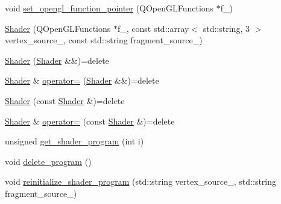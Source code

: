 \begin{DoxyCompactItemize}
\item 
void \mbox{\hyperlink{classShader_a28b5fcd256a5182778c860c961ae6a31}{set\+\_\+opengl\+\_\+function\+\_\+pointer}} (Q\+Open\+G\+L\+Functions $\ast$f\+\_\+)
\item 
\mbox{\hyperlink{classShader_a934bb76fa1a2c18d454d85d842d0792b}{Shader}} (Q\+Open\+G\+L\+Functions $\ast$f\+\_\+, const std\+::array$<$ std\+::string, 3 $>$ vertex\+\_\+source\+\_\+, const std\+::string fragment\+\_\+source\+\_\+)
\item 
\mbox{\hyperlink{classShader_a7e30078f161d1c9f48a7b3921c01f816}{Shader}} (\mbox{\hyperlink{classShader}{Shader}} \&\&)=delete
\item 
\mbox{\hyperlink{classShader}{Shader}} \& \mbox{\hyperlink{classShader_a3b92fece66095389581a2bf6b3124657}{operator=}} (\mbox{\hyperlink{classShader}{Shader}} \&\&)=delete
\item 
\mbox{\hyperlink{classShader_a49b2a448a00b5e1413c17501f8873cca}{Shader}} (const \mbox{\hyperlink{classShader}{Shader}} \&)=delete
\item 
\mbox{\hyperlink{classShader}{Shader}} \& \mbox{\hyperlink{classShader_a58f724fecccecdb1633e08ce0258da37}{operator=}} (const \mbox{\hyperlink{classShader}{Shader}} \&)=delete
\item 
unsigned \mbox{\hyperlink{classShader_a2c19b216850480109f9d5f7ed6ab6aa6}{get\+\_\+shader\+\_\+program}} (int i)
\item 
void \mbox{\hyperlink{classShader_aaa9a1f01655e7b8de1f57c9b5d4d0724}{delete\+\_\+program}} ()
\item 
void \mbox{\hyperlink{classShader_a519cf95dff88c4da52ab6a4c3494b441}{reinitialize\+\_\+shader\+\_\+program}} (std\+::string vertex\+\_\+source\+\_\+, std\+::string fragment\+\_\+source\+\_\+)
\end{DoxyCompactItemize}
